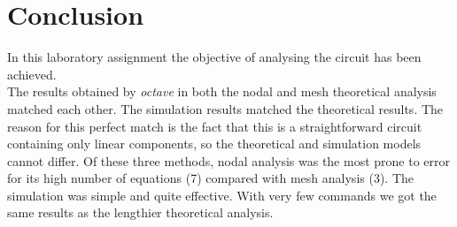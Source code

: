 \section{Conclusion}
\label{sec:conclusion}

In this laboratory assignment the objective of analysing the circuit has been achieved. \\
The results obtained by \textit{octave} in both the nodal and mesh theoretical analysis matched each other. The simulation results matched the theoretical results. The reason for this perfect match is the fact that this is a straightforward circuit containing only linear components, so the theoretical and simulation models cannot differ. Of these three methods, nodal analysis was the most prone to error for its high number of equations (7) compared with mesh analysis (3). The simulation was simple and quite effective. With very few commands we got the same results as the lengthier theoretical analysis.
